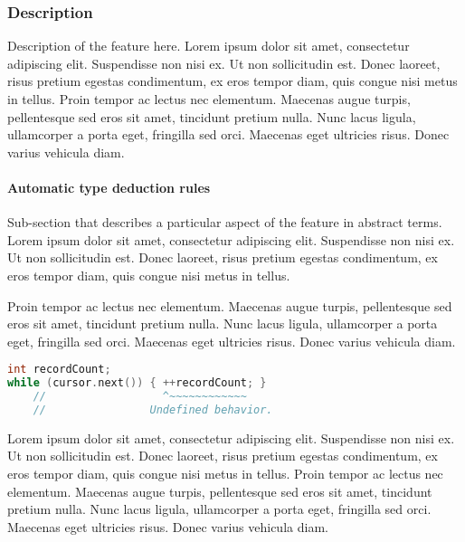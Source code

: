\documentclass[twoside,10pt,letterpaper,usenames]{newstyle-PearsonGeneric-7-38}
\let\Begin\begin
\let\End\end
\begin{document}
\subsubsection[Description]{Description}\label{description}

Description of the feature here. Lorem ipsum dolor sit amet, consectetur
adipiscing elit. Suspendisse non nisi ex. Ut non sollicitudin est. Donec
laoreet, risus pretium egestas condimentum, ex eros tempor diam, quis
congue nisi metus in tellus. Proin tempor ac lectus nec elementum.
Maecenas augue turpis, pellentesque sed eros sit amet, tincidunt pretium
nulla. Nunc lacus ligula, ullamcorper a porta eget, fringilla sed orci.
Maecenas eget ultricies risus. Donec varius vehicula diam.

\paragraph[Automatic type deduction rules]{Automatic type deduction rules}\label{automatic-type-deduction-rules}

Sub-section that describes a particular aspect of the feature in
abstract terms. Lorem ipsum dolor sit amet, consectetur adipiscing elit.
Suspendisse non nisi ex. Ut non sollicitudin est. Donec laoreet, risus
pretium egestas condimentum, ex eros tempor diam, quis congue nisi metus
in tellus.

\Begin{leftbar}

Proin tempor ac lectus nec elementum. Maecenas augue turpis,
pellentesque sed eros sit amet, tincidunt pretium nulla. Nunc lacus
ligula, ullamcorper a porta eget, fringilla sed orci. Maecenas eget
ultricies risus. Donec varius vehicula diam.

\begin{lstlisting}[language=C++, caption={example caption for recordcount}, label={testlabel}, frame=tb]
int recordCount;
while (cursor.next()) { ++recordCount; }
    //                  ^~~~~~~~~~~~~
    //                Undefined behavior.
\end{lstlisting}
    

\End{leftbar}

Lorem ipsum dolor sit amet, consectetur adipiscing elit. Suspendisse non
nisi ex. Ut non sollicitudin est. Donec laoreet, risus pretium egestas
condimentum, ex eros tempor diam, quis congue nisi metus in tellus.
Proin tempor ac lectus nec elementum. Maecenas augue turpis,
pellentesque sed eros sit amet, tincidunt pretium nulla. Nunc lacus
ligula, ullamcorper a porta eget, fringilla sed orci. Maecenas eget
ultricies risus. Donec varius vehicula diam.
\end{document}
